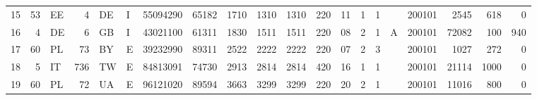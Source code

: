 \begin{tabular}{lrlrlllllllllrrlrrrr}
15 & 53 & EE & 4 & DE & I & 55094290 & 65182 & 1710 & 1310 & 1310 & 220 & 11 & 1 & 1 &  & 200101 & 2545 & 618 & 0 \\
16 & 4 & DE & 6 & GB & I & 43021100 & 61311 & 1830 & 1511 & 1511 & 220 & 08 & 2 & 1 & A & 200101 & 72082 & 100 & 940 \\
17 & 60 & PL & 73 & BY & E & 39232990 & 89311 & 2522 & 2222 & 2222 & 220 & 07 & 2 & 3 &  & 200101 & 1027 & 272 & 0 \\
18 & 5 & IT & 736 & TW & E & 84813091 & 74730 & 2913 & 2814 & 2814 & 420 & 16 & 1 & 1 &  & 200101 & 21114 & 1000 & 0 \\
19 & 60 & PL & 72 & UA & E & 96121020 & 89594 & 3663 & 3299 & 3299 & 220 & 20 & 2 & 1 &  & 200101 & 11016 & 800 & 0 \\
\end{tabular}
